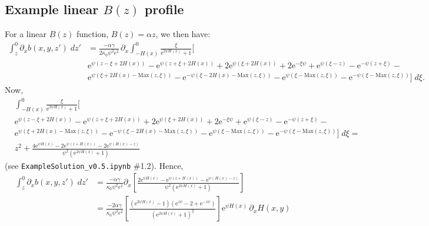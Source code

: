 \documentclass[10pt]{amsart}
\begin{document}
\subsection{Example linear $B(z)$ profile}
For a linear $B(z)$ function, $B(z) = \alpha z$, we then have:
\begin{align}
 \int_{z}^{0} \partial_x b(x,y,z') \; dz' 
 & = \frac{- \alpha  \gamma}{2 \kappa_0  \psi^{2} \epsilon^{2}} \,  \partial_x  \int_{-H(x)}^{0} 
\frac{ \xi}{  \mathrm{e}^{2 \psi H\left( x \right)} + 1  }\bigg[ \nonumber \\
& \mathrm{e}^{\psi \left( z  - \xi + 2  H(x)\right)} -
 \mathrm{e}^{\psi \left( z + \xi + 2 H(x)\right)} +
2 \mathrm{e}^{\psi \left( \xi + 2  H(x) \right) } + 
2 \mathrm{e}^{ - \xi \psi} +  
\mathrm{e}^{  \psi \left(  \xi - z \right)} - 
\mathrm{e}^{ - \psi \left( z + \xi \right)} - \nonumber \\
& \mathrm{e}^{ \psi \left( \xi + 2  H(x) -  \mathrm{Max}\left( z, \xi \right)\right)} - 
\mathrm{e}^{ - \psi \left( \xi - 2  H(x) -  \mathrm{Max}\left( z, \xi \right) \right)} -
\mathrm{e}^{ \psi \left( \xi  -  \mathrm{Max}\left( z, \xi \right) \right)} - 
 \mathrm{e}^{ - \psi \left( \xi - \mathrm{Max}\left( z, \xi \right) \right)} 
\bigg]
 \; d \xi \nonumber .
 \end{align}
Now, 
\begin{align}
&\int_{-H(x)}^{0} 
\frac{ \xi}{  \mathrm{e}^{2 \psi H\left( x \right)} + 1  }\bigg[ \nonumber \\
& \mathrm{e}^{\psi \left( z  - \xi + 2  H(x)\right)} -
 \mathrm{e}^{\psi \left( z + \xi + 2 H(x)\right)} +
2 \mathrm{e}^{\psi \left( \xi + 2  H(x) \right) } + 
2 \mathrm{e}^{ - \xi \psi} +  
\mathrm{e}^{  \psi \left(  \xi - z \right)} - 
\mathrm{e}^{ - \psi \left( z + \xi \right)} - \nonumber \\
& \mathrm{e}^{ \psi \left( \xi + 2  H(x) -  \mathrm{Max}\left( z, \xi \right)\right)} - 
\mathrm{e}^{ - \psi \left( \xi - 2  H(x) -  \mathrm{Max}\left( z, \xi \right) \right)} -
\mathrm{e}^{ \psi \left( \xi  -  \mathrm{Max}\left( z, \xi \right) \right)} - 
 \mathrm{e}^{ - \psi \left( \xi - \mathrm{Max}\left( z, \xi \right) \right)} 
\bigg]
 \; d \xi  = \nonumber \\
& z^2 + \frac{ 4 \mathrm{e}^{ \psi  H(x)} 
- 2 \mathrm{e}^{ \psi \left(  z + H(x) \right)} 
- 2 \mathrm{e}^{ \psi \left(  H(x) - z \right)} }{  \psi^{2}  \left( \mathrm{e}^{2  \psi H(x)} + 1 \right)}  \nonumber
 \end{align}
 (see \texttt{ExampleSolution\_v0.5.ipynb} \#1.2).
 Hence,
 \begin{align}
 \int_{z}^{0} \partial_x b(x,y,z') \; dz' & = \frac{- \alpha  \gamma}{ \kappa_0  \psi^{2} \epsilon^{2}} \partial_x \left[
 \frac{ 2 \mathrm{e}^{ \psi  H(x)} 
- \mathrm{e}^{ \psi \left(  z + H(x) \right)} 
- \mathrm{e}^{ \psi \left(  H(x) - z \right)} }{  \psi^{2}  \left( \mathrm{e}^{2  \psi H(x)} + 1 \right)} 
\right] \nonumber \\
& = \frac{- 2 \alpha  \gamma }{\kappa_0  \psi^{3} \epsilon^{2}} \left[
\frac{ \left( \mathrm{e}^{2 \psi H(x)} - 1 \right)  \left( \mathrm{e}^{z \psi} - 2 + \mathrm{e}^{ - z \psi} \right) }{\left( \mathrm{e}^{2 \psi H(x)} + 1 \right)^{2}} \right]  \mathrm{e}^{\psi H(x)} \, \partial_x H(x,y) \nonumber
\end{align}
\end{document}
